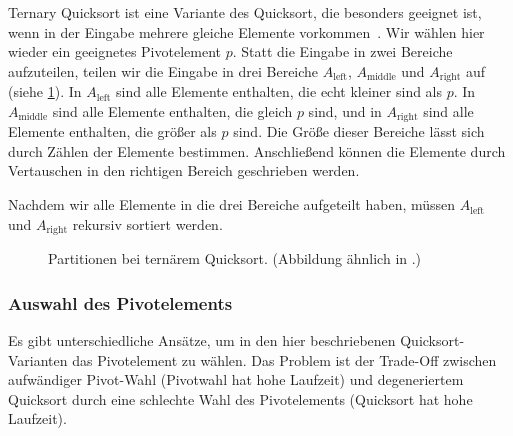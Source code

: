 \noindent
Ternary Quicksort ist eine Variante des Quicksort, die besonders geeignet ist,
wenn in der Eingabe mehrere gleiche Elemente vorkommen~\cite{ternary_quicksort}.
Wir wählen hier wieder ein geeignetes Pivotelement $p$.
Statt die Eingabe in zwei Bereiche aufzuteilen, teilen wir die Eingabe in drei Bereiche $A_{\text{left}}$, $A_{\text{middle}}$ und $A_{\text{right}}$ auf (siehe \cref{fg:ternary_partitions}).
In $A_{\text{left}}$ sind alle Elemente enthalten, die echt kleiner sind als $p$.
In $A_{\text{middle}}$ sind alle Elemente enthalten, die gleich $p$ sind, und in $A_{\text{right}}$ sind alle Elemente enthalten, die größer als $p$ sind.
Die Größe dieser Bereiche lässt sich durch Zählen der Elemente bestimmen.
Anschließend können die Elemente durch Vertauschen in den richtigen Bereich geschrieben werden.

Nachdem wir alle Elemente in die drei Bereiche aufgeteilt haben, müssen $A_{\text{left}}$ und $A_{\text{right}}$ rekursiv sortiert werden.

\begin{figure}[!h]
	\centering
	\caption[Partitionen bei ternary Quicksort]{Partitionen bei ternärem Quicksort. (Abbildung ähnlich in \cite{ternary_quicksort}.)}
	\label{fg:ternary_partitions}
\end{figure}

\subsubsection{Auswahl des Pivotelements}

Es gibt unterschiedliche Ansätze, um in den hier beschriebenen Quicksort-Varianten das Pivotelement zu wählen.
Das Problem ist der Trade-Off zwischen aufwändiger Pivot-Wahl (Pivotwahl hat hohe Laufzeit) und
degeneriertem Quicksort durch eine schlechte Wahl des Pivotelements (Quicksort hat hohe Laufzeit).

